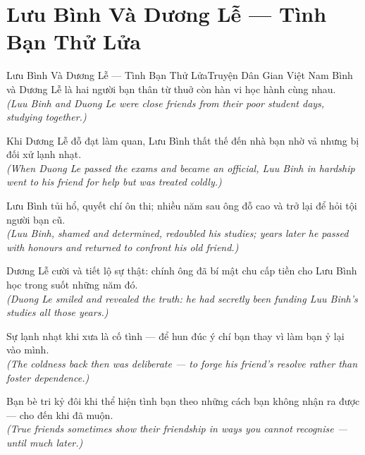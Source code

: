 \section{Lưu Bình Và Dương Lễ --- Tình Bạn Thử Lửa}
\begin{truyen}{Lưu Bình Và Dương Lễ --- Tình Bạn Thử Lửa}{Truyện Dân Gian Việt Nam}
 Bình và Dương Lễ là hai người bạn thân từ thuở còn hàn vi học hành cùng nhau.\\[4pt]
\textit{(Luu Binh and Duong Le were close friends from their poor student days, studying together.)}

Khi Dương Lễ đỗ đạt làm quan, Lưu Bình thất thế đến nhà bạn nhờ vả nhưng bị đối xử lạnh nhạt.\\[4pt]
\textit{(When Duong Le passed the exams and became an official, Luu Binh in hardship went to his friend for help but was treated coldly.)}

Lưu Bình tủi hổ, quyết chí ôn thi; nhiều năm sau ông đỗ cao và trở lại để hỏi tội người bạn cũ.\\[4pt]
\textit{(Luu Binh, shamed and determined, redoubled his studies; years later he passed with honours and returned to confront his old friend.)}

Dương Lễ cười và tiết lộ sự thật: chính ông đã bí mật chu cấp tiền cho Lưu Bình học trong suốt những năm đó.\\[4pt]
\textit{(Duong Le smiled and revealed the truth: he had secretly been funding Luu Binh's studies all those years.)}

Sự lạnh nhạt khi xưa là cố tình --- để hun đúc ý chí bạn thay vì làm bạn ỷ lại vào mình.\\[4pt]
\textit{(The coldness back then was deliberate --- to forge his friend's resolve rather than foster dependence.)}

\end{truyen}
\begin{baihoc}
  Bạn bè tri kỷ đôi khi thể hiện tình bạn theo những cách bạn không nhận ra được --- cho đến khi đã muộn.\\[4pt]
  \textit{(True friends sometimes show their friendship in ways you cannot recognise --- until much later.)}
\end{baihoc}

